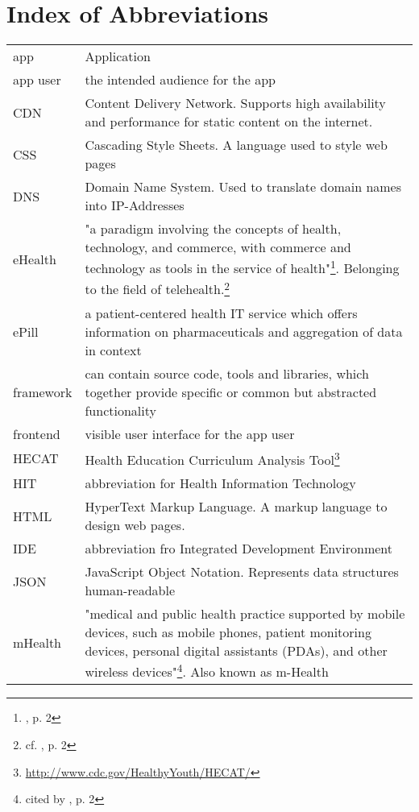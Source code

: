 \section*{Index of Abbreviations}
\begin{longtable}{@{}p{}@{}p{}@{}}
    app & Application\\
    app user & the intended audience for the app\\
    CDN & Content Delivery Network. Supports high availability and performance for static content on the internet. \\
    CSS & Cascading Style Sheets. A language used to style web pages \\
    DNS & Domain Name System. Used to translate domain names into IP-Addresses \\
    eHealth & "a paradigm involving the concepts of health, technology, and commerce, with commerce and technology as tools in the service of health"\footnote{\cite{MartinezPerez.2013}, p. 2}. Belonging to the field of telehealth.\footnote{cf. \cite{MartinezPerez.2013}, p. 2}\\
    ePill & a patient-centered health IT service which offers information on pharmaceuticals and aggregation of data in context\\
    framework & can contain source code, tools and libraries, which together provide specific or common but abstracted functionality\\
    frontend & visible user interface for the app user\\
    HECAT & Health Education Curriculum Analysis Tool\footnote{\url{http://www.cdc.gov/HealthyYouth/HECAT/}}\\
    HIT & abbreviation for Health Information Technology\\
    HTML & HyperText Markup Language. A markup language to design web pages. \\
    IDE & abbreviation fro Integrated Development Environment\\
    JSON & JavaScript Object Notation. Represents data structures human-readable \\
    mHealth & "medical and public health practice supported by mobile devices, such as mobile phones, patient monitoring devices, personal digital assistants (PDAs), and other wireless devices"\footnote{\cite{WorldHealthOrganization.2011} cited by \cite{MartinezPerez.2013}, p. 2}. Also known as m-Health\\

\end{longtable}
